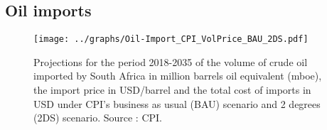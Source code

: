 \documentclass[12pt,english]{article}
\begin{document}
%
%
%
%
%
%
%


\subsection{Oil imports}

\begin{figure}[!t]
	\centering
	\texttt{[image: ../graphs/Oil-Import\_CPI\_VolPrice\_BAU\_2DS.pdf]}
	\caption{\label{Oil-Import_CPI_VolPrice_BAU_2DS}\small Projections for the period 2018-2035 of the volume of crude oil imported by South Africa in million barrels oil equivalent (mboe), the import price in USD/barrel and the total cost of imports in USD under CPI's business as usual (BAU) scenario and 2 degrees (2DS) scenario. Source : CPI.}
\end{figure}
\end{document}
